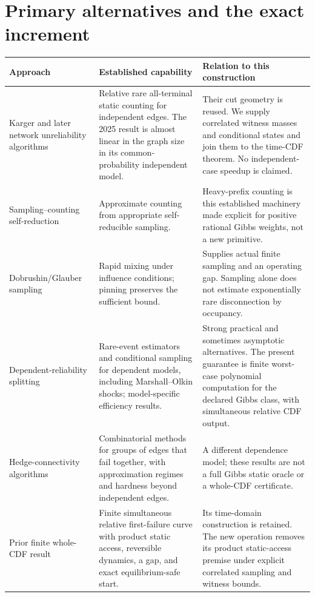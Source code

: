 \documentclass[11pt]{article}
\begin{document}
\section{Primary alternatives and the exact increment}
\begin{longtable}{>{\raggedright\arraybackslash}p{}>{\raggedright\arraybackslash}p{}>{\raggedright\arraybackslash}p{}}
\toprule
Approach & Established capability & Relation to this construction\\\midrule\endhead
Karger and later network unreliability algorithms \cite{karger,cen} & Relative rare all-terminal static counting for independent edges. The 2025 result is almost linear in the graph size in its common-probability independent model. & Their cut geometry is reused. We supply correlated witness masses and conditional states and join them to the time-CDF theorem. No independent-case speedup is claimed.\\
Sampling--counting self-reduction \cite{jvv} & Approximate counting from appropriate self-reducible sampling. & Heavy-prefix counting is this established machinery made explicit for positive rational Gibbs weights, not a new primitive.\\
Dobrushin/Glauber sampling \cite{hayes} & Rapid mixing under influence conditions; pinning preserves the sufficient bound. & Supplies actual finite sampling and an operating gap. Sampling alone does not estimate exponentially rare disconnection by occupancy.\\
Dependent-reliability splitting \cite{botev,marshall} & Rare-event estimators and conditional sampling for dependent models, including Marshall--Olkin shocks; model-specific efficiency results. & Strong practical and sometimes asymptotic alternatives. The present guarantee is finite worst-case polynomial computation for the declared Gibbs class, with simultaneous relative CDF output.\\
Hedge-connectivity algorithms \cite{hedge} & Combinatorial methods for groups of edges that fail together, with approximation regimes and hardness beyond independent edges. & A different dependence model; these results are not a full Gibbs static oracle or a whole-CDF certificate.\\
Prior finite whole-CDF result \cite{prior} & Finite simultaneous relative first-failure curve with product static access, reversible dynamics, a gap, and exact equilibrium-safe start. & Its time-domain construction is retained. The new operation removes its product static-access premise under explicit correlated sampling and witness bounds.\\\bottomrule
\end{longtable}
\end{document}
